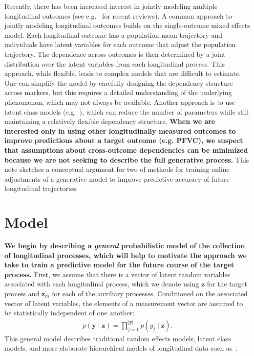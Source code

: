 \documentclass[12pt]{article}
\newcommand{\given}{\mid}
\begin{document}
Recently, there has been increased interest in jointly modeling multiple longitudinal outcomes (see e.g.~\cite{Verbeke2014-cs,Fieuws2007-qo} for recent reviews). A common approach to jointly modeling longitudinal outcomes builds on the single-outcome mixed effects model. Each longitudinal outcome has a population mean trajectory and individuals have latent variables for each outcome that adjust the population trajectory. The dependence across outcomes is then determined by a joint distribution over the latent variables from each longitudinal process. This approach, while flexible, leads to complex models that are difficult to estimate. One can simplify the model by carefully designing the dependency structure across markers, but this requires a detailed understanding of the underlying phenomenon, which may not always be available. Another approach is to use latent class models (e.g.~\cite{Putter2008-gx}), which can reduce the number of parameters while still maintaining a relatively flexible dependency structure. \textbf{When we are interested only in using other longitudinally measured outcomes to improve predictions about a target outcome (e.g. PFVC), we suspect that assumptions about cross-outcome dependencies can be minimized because we are not seeking to describe the full generative process.} This note sketches a conceptual argument for two of methods for training online adjustments of a generative model to improve predictive accuracy of future longitudinal trajectories. 

\section{Model}

\textbf{We begin by describing a \emph{general} probabilistic model of the collection of longitudinal processes, which will help to motivate the approach we take to train a predictive model for the future course of the target process.} First, we assume that there is a vector of latent random variables associated with each longitudinal process, which we denote using $\bm{z}$ for the target process and $\bm{z}_m$ for each of the auxiliary processes. Conditioned on the associated vector of latent variables, the elements of a measurement vector are assumed to be statistically independent of one another:
\begin{align}
p(\bm{y} \given \bm{z}) = \prod_{j=1}^{|\bm{y}|} p( y_j \given \bm{z} ).
\end{align}
This general model describes traditional random effects models, latent class models, and more elaborate hierarchical models of longitudinal data such as~\cite{Schulam2015-ah}.
\end{document}
